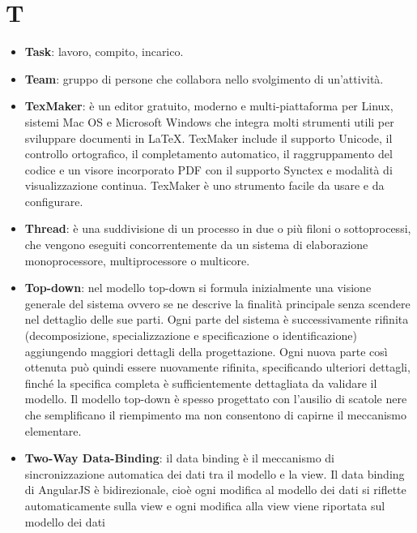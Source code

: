 \section{T}
\begin{itemize}
	\item
	\textbf{Task}: lavoro, compito, incarico.
	\item
	\textbf{Team}: gruppo di persone che collabora nello svolgimento di un'attività.
	\item
	\textbf{TexMaker}: è un editor gratuito, moderno e multi-piattaforma per Linux, sistemi Mac OS e Microsoft Windows che integra molti strumenti utili per sviluppare documenti in \LaTeX.
	TexMaker include il supporto Unicode, il controllo ortografico, il completamento automatico, il raggruppamento del codice e un visore incorporato PDF con il supporto Synctex e modalità di visualizzazione continua.
	TexMaker è uno strumento facile da usare e da configurare.
	\item
	\textbf{Thread}:  è una suddivisione di un processo in due o più filoni o sottoprocessi, che vengono eseguiti concorrentemente da un sistema di elaborazione monoprocessore, multiprocessore o multicore.
	\item
	\textbf{Top-down}: nel modello top-down si formula inizialmente una visione generale del sistema ovvero se ne descrive la finalità principale senza scendere nel dettaglio delle sue parti. Ogni parte del sistema è successivamente rifinita (decomposizione, specializzazione e specificazione o identificazione) aggiungendo maggiori dettagli della progettazione. Ogni nuova parte così ottenuta può quindi essere nuovamente rifinita, specificando ulteriori dettagli, finché la specifica completa è sufficientemente dettagliata da validare il modello. Il modello top-down è spesso progettato con l'ausilio di scatole nere che semplificano il riempimento ma non consentono di capirne il meccanismo elementare.
	\item
	\textbf{Two-Way Data-Binding}: il data binding è il meccanismo di sincronizzazione automatica dei dati tra il modello e la view. Il data binding di AngularJS è bidirezionale, cioè ogni modifica al modello dei dati si riflette automaticamente sulla view e ogni modifica alla view viene riportata sul modello dei dati
\end{itemize}

